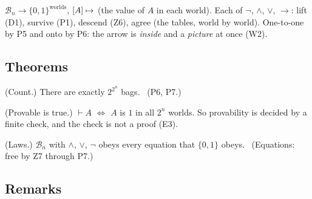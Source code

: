 \begin{lines}
\item[\lab{P7}] $\mathcal{B}_n \to \{0, 1\}^{\text{worlds}}$, $[A] \mapsto$ (the value of $A$ in each world). Each of $\neg$, $\wedge$, $\vee$, $\to$: lift (D1), survive (P1), descend (Z6), agree (the tables, world by world). One-to-one by P5 and onto by P6: the arrow is \emph{inside} and a \emph{picture} at once (W2).
\end{lines}

\subsection*{Theorems}

\begin{lines}
\item[\lab{T1}] (Count.) There are exactly $2^{2^n}$ bags. \ (P6, P7.)
\item[\lab{T2}] (Provable is true.) $\vdash A$ $\iff$ $A$ is $1$ in all $2^n$ worlds. So provability is decided by a finite check, and the check is not a proof (E3).
\item[\lab{T3}] (Laws.) $\mathcal{B}_n$ with $\wedge$, $\vee$, $\neg$ obeys every equation that $\{0, 1\}$ obeys. \ (Equations: free by Z7 through P7.)
\end{lines}

\subsection*{Remarks}


